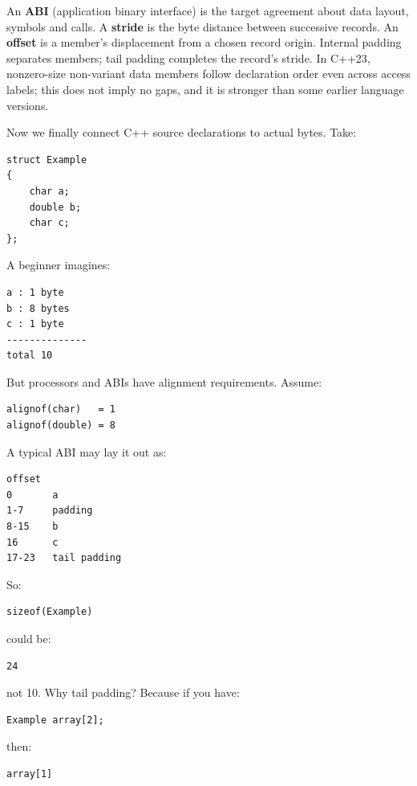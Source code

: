\hypertarget{01-foundations-i-ch003-bringing-the-object-model-back-to-bytes}{}

An \textbf{ABI} (application binary interface) is the target agreement about data layout, symbols and calls. A \textbf{stride} is the byte distance between successive records. An \textbf{offset} is a member's displacement from a chosen record origin. Internal padding separates members; tail padding completes the record's stride. In C++23, nonzero-size non-variant data members follow declaration order even across access labels; this does not imply no gaps, and it is stronger than some earlier language versions.

Now we finally connect C++ source declarations to actual bytes. Take:

\begin{verbatim}
struct Example
{
    char a;
    double b;
    char c;
};
\end{verbatim}

A beginner imagines:

\begin{verbatim}
a : 1 byte
b : 8 bytes
c : 1 byte
--------------
total 10
\end{verbatim}

But processors and ABIs have alignment requirements. Assume:

\begin{verbatim}
alignof(char)   = 1
alignof(double) = 8
\end{verbatim}

A typical ABI may lay it out as:

\begin{verbatim}
offset
0       a
1-7     padding
8-15    b
16      c
17-23   tail padding
\end{verbatim}

So:

\begin{verbatim}
sizeof(Example)
\end{verbatim}

could be:

\begin{verbatim}
24
\end{verbatim}

not 10. Why tail padding? Because if you have:

\begin{verbatim}
Example array[2];
\end{verbatim}

then:

\begin{verbatim}
array[1]
\end{verbatim}

